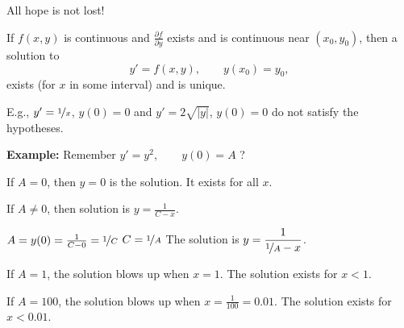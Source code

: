 \documentclass[10pt,aspectratio=169]{beamer}
\begin{document}
\begin{frame}
All hope is not lost!

\pause

\begin{theorem}%
If $f(x,y)$ is continuous and $\frac{\partial f}{\partial y}$ exists and is
continuous near $(x_0,y_0)$, then a solution to
\begin{equation*}
y' = f(x,y), \qquad y(x_0) = y_0,
\end{equation*}
exists (for $x$ in some interval) and is unique.
\end{theorem}

\pause

E.g., \quad $y' = \nicefrac{1}{x}$, $y(0) = 0$
\quad and \quad $y' = 2 \sqrt{\lvert y \rvert}$, $y(0) = 0$ \quad
do not satisfy the hypotheses.

\medskip
\pause

\textbf{Example:}
Remember
\quad
$
y' = y^2, \qquad y(0) = A$ \quad ?

\medskip
\pause

If $A=0$, then $y=0$ is the solution.  It exists for all $x$.

\medskip
\pause

If $A\not=0$, then solution is $y=\frac{1}{C-x}$.

\medskip
\pause

$A = y(0) = \frac{1}{C-0} = \nicefrac{1}{C}$
\pause
\wthus
$C=\nicefrac{1}{A}$
\pause
\wthus
The solution is
$\displaystyle
y = \frac{1}{\nicefrac{1}{A} - x}$.

\medskip
\pause

If $A=1$, the solution blows up when $x=1$.
The solution exists for $x < 1$.

\medskip
\pause

If $A=100$, the solution blows up when $x=\frac{1}{100}=0.01$.
The solution exists for $x < 0.01$.
\end{frame}
\end{document}
